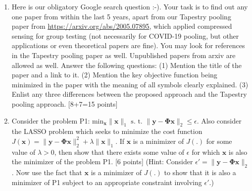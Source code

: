 \documentclass[11pt]{article}
\begin{document}
\begin{enumerate}
\item Here is our obligatory Google search question :-). Your task is to find out any one paper from within the last 5 years, apart from our Tapestry pooling paper from \url{https://arxiv.org/abs/2005.07895}, which applied compressed sensing for group testing (not necessarily for COVID-19 pooling, but other applications or even theoretical papers are fine). You may look for references in the Tapestry pooling paper as well. Unpublished papers from arxiv are allowed as well. Answer the following questions: (1) Mention the title of the paper and a link to it. (2) Mention the key objective function being minimized in the paper with the meaning of all symbols clearly explained. (3) Enlist any three differences between the proposed approach and the Tapestry pooling approach. \textsf{[8+7=15 points]}

\item Consider the problem P1: $\textrm{min}_{\boldsymbol{x}} \|\boldsymbol{x}\|_1 \textrm{ s. t. } \|\boldsymbol{y}-\boldsymbol{\Phi x}\|_2 \leq \epsilon$. Also consider the LASSO problem which seeks to minimize the cost function $J(\boldsymbol{x}) = \|\boldsymbol{y}-\boldsymbol{\Phi x}\|^2_2 + \lambda \|\boldsymbol{x}\|_1$. If $\boldsymbol{x}$ is a minimizer of $J(.)$ for some value of $\lambda > 0$, then show that there exists some value of $\epsilon$ for which $\boldsymbol{x}$ is also the minimizer of the problem P1. \textsf{[6 points]} (Hint: Consider $\epsilon' = \|\boldsymbol{y} - \boldsymbol{\Phi x}\|_2$. Now use the fact that $\boldsymbol{x}$ is a minimizer of $J(.)$ to show that it is also a minimizer of P1 subject to an appropriate constraint involving $\epsilon'$.)

\end{enumerate}
\end{document}
